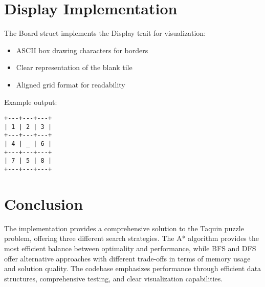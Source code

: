 \documentclass[a4paper]{article}
\begin{document}
\section{Display Implementation}
The Board struct implements the Display trait for visualization:
\begin{itemize}
    \item ASCII box drawing characters for borders
    \item Clear representation of the blank tile
    \item Aligned grid format for readability
\end{itemize}

Example output:
\begin{verbatim}
+---+---+---+
| 1 | 2 | 3 |
+---+---+---+
| 4 | _ | 6 |
+---+---+---+
| 7 | 5 | 8 |
+---+---+---+
\end{verbatim}

\section{Conclusion}
The implementation provides a comprehensive solution to the Taquin puzzle problem, offering three different search strategies. The A* algorithm provides the most efficient balance between optimality and performance, while BFS and DFS offer alternative approaches with different trade-offs in terms of memory usage and solution quality. The codebase emphasizes performance through efficient data structures, comprehensive testing, and clear visualization capabilities.
\end{document}
